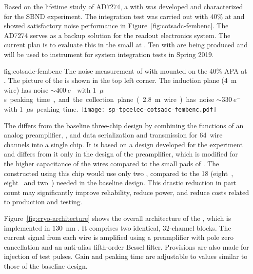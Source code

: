 Based on the lifetime study of AD7274, a  with  
 was developed and characterized for the SBND experiment. The 
integration test was carried out with 40\%  at  and 
showed satisfactory noise performance in Figure~\ref{fig:cotsadc-fembenc}. 
The   AD7274 serves as a backup solution for the 
   readout electronics system. The current 
plan is to evaluate this  in the small  
 at . Ten  with  
 are being produced and will be used to instrument  
 for system integration tests in Spring 2019. 

\begin{dunefigure}
{fig:cotsadc-fembenc}
{The noise measurement of  with   
mounted on the \num{40}\% APA at . The picture of the 
 is shown in the top left corner. The induction plane 
(\SI{4}{m} wire) has noise $\sim\SI{400}{e^-}$ with \SI{1}{$\mu$s} 
peaking time, and the collection plane (\SI{2.8}{m} wire) has noise 
$\sim\SI{330}{e^-}$ with \SI{1}{$\mu$s} peaking time.}
\texttt{[image: sp-tpcelec-cotsadc-fembenc.pdf]}
\end{dunefigure}


\label{sec:fdsp-tpcelec-design-femb-alt-cryo}

The    differs from the baseline 
three-chip design by combining the functions of an analog 
preamplifier, , and data serialization and transmission 
for \num{64}~wire channels into a single chip. It is based on a design 
developed for the  experiment~\cite{nEXO} and differs from 
it only in the design of the preamplifier, which is modified for the 
higher capacitance of the   wires compared 
to the small pads of . The  constructed using 
this chip would use only two , compared to the \num{18} 
(eight~, eight~ and two~) needed 
in the baseline design. This drastic reduction in part count may 
significantly improve  reliability, reduce power, and reduce 
costs related to production and testing. 

Figure~\ref{fig:cryo-architecture} shows the overall architecture of 
the  , which is implemented in 
\SI{130}{nm} . It comprises two identical, \num{32}-channel 
blocks. The current signal from each wire is amplified using a preamplifier 
with pole zero cancellation and an anti-alias fifth-order Bessel filter. 
Provisions are also made for injection of test pulses. Gain and peaking 
time are adjustable to values similar to those of the baseline design.

